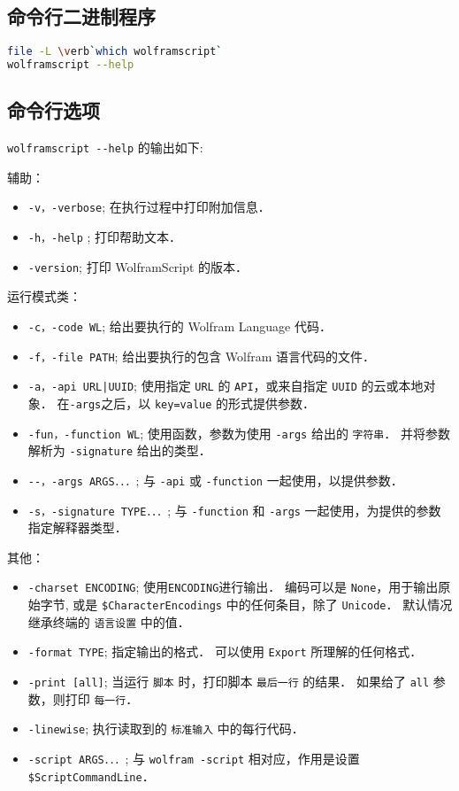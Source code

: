 
\begin{issues}
\issueDraft
\issueTODO
\end{issues}

\subsection{命令行二进制程序}

\begin{lstlisting}[language=bash]
file -L \verb`which wolframscript`
wolframscript --help
\end{lstlisting}

\subsection{命令行选项} 

\verb`wolframscript --help` 的输出如下:

辅助：
\begin{itemize}
\item \verb`-v，-verbose`; 在执行过程中打印附加信息．
\item \verb`-h，-help` ; 打印帮助文本．
\item \verb`-version`; 打印 WolframScript 的版本．
\end{itemize}
运行模式类：
\begin{itemize}
\item \verb`-c，-code WL`; 给出要执行的 Wolfram Language 代码．
\item \verb`-f，-file PATH`; 给出要执行的包含 Wolfram 语言代码的文件．
\item \verb`-a，-api URL|UUID`; 使用指定 \verb`URL` 的 \verb`API`，或来自指定 \verb`UUID` 的云或本地对象． 
在\verb`-args`之后，以 \verb`key=value` 的形式提供参数．
\item \verb`-fun，-function WL`; 使用函数，参数为使用 \verb`-args` 给出的 \verb`字符串`．
并将参数解析为 \verb`-signature` 给出的类型．
\item \verb`--，-args ARGS．．．`; 与 \verb`-api` 或 \verb`-function` 一起使用，以提供参数．
\item \verb`-s，-signature TYPE．．．`; 与 \verb`-function` 和 \verb`-args` 一起使用，为提供的参数指定解释器类型．
\end{itemize}
其他：
\begin{itemize}
\item \verb`-charset ENCODING`; 使用\verb`ENCODING`进行输出． 编码可以是 \verb`None`，用于输出原始字节,
或是 \verb`$CharacterEncodings` 中的任何条目，除了 \verb`Unicode`． 默认情况继承终端的 \verb`语言设置` 中的值．
\item \verb`-format TYPE`; 指定输出的格式． 可以使用 \verb`Export` 所理解的任何格式．
\item \verb`-print [all]`; 当运行 \verb`脚本` 时，打印脚本 \verb`最后一行` 的结果． 如果给了 \verb`all` 参数，则打印 \verb`每一行`．
\item \verb`-linewise`; 执行读取到的 \verb`标准输入` 中的每行代码．
\item \verb`-script ARGS．．．`; 与 \verb`wolfram -script` 相对应，作用是设置 \verb`$ScriptCommandLine`．
\end{itemize}

